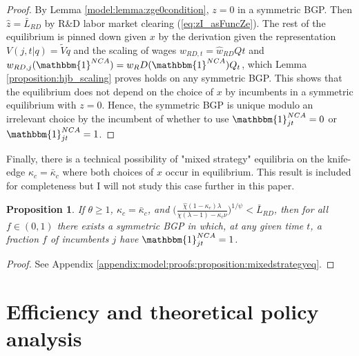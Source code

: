 \documentclass[11pt,english]{article}
\newtheorem{proposition}{Proposition}
\begin{document}
\begin{proof}
	By Lemma \ref{model:lemma:zge0condition}, $z = 0$ in a symmetric BGP. Then $\hat{z} = \bar{L}_{RD}$ by R\&D labor market clearing (\ref{eq:zI_asFuncZe}). The rest of the equilibrium is pinned down given $x$ by the derivation given the representation $V(j,t|q) = \tilde{V}q$ and the scaling of wages $\hat{w}_{RD,t} = \hat{w}_{RD}Qt$ and $w_{RD,j}(\mathbbm{1}^{NCA}) = w_RD(\mathbbm{1}^{NCA}) Q_t$, which Lemma \ref{proposition:hjb_scaling} proves holds on any symmetric BGP. This shows that the equilibrium does not depend on the choice of $x$ by incumbents in a symmetric equilibrium with $z = 0$. Hence, the symmetric BGP is unique modulo an irrelevant choice by the incumbent of whether to use $\mathbbm{1}^{NCA}_{jt} = 0$ or $\mathbbm{1}^{NCA}_{jt} = 1$. 
\end{proof}

Finally, there is a technical possibility of "mixed strategy" equilibria on the knife-edge $\kappa_c = \bar{\kappa}_c$ where both choices of $x$ occur in equilibrium. This result is included for completeness but I will not study this case further in this paper.

\begin{proposition}\label{proposition:mixedstrategyeq}
	If $\theta \ge 1$, $\kappa_c = \bar{\kappa}_c$, and $\Big( \frac{\hat{\chi} (1-\kappa_{e}) \lambda}{\chi(\lambda-1) - \kappa_{c} \nu} \Big)^{1/\psi} < \bar{L}_{RD}$, then for all $f \in (0,1)$ there exists a symmetric BGP in which, at any given time $t$, a fraction $f$ of incumbents $j$ have $\mathbbm{1}^{NCA}_{jt} = 1$.  
\end{proposition}

\begin{proof}
	See Appendix \ref{appendix:model:proofs:proposition:mixedstrategyeq}.
\end{proof}


\section{Efficiency and theoretical policy analysis}\label{model:efficiency:efficiency}


\end{document}

